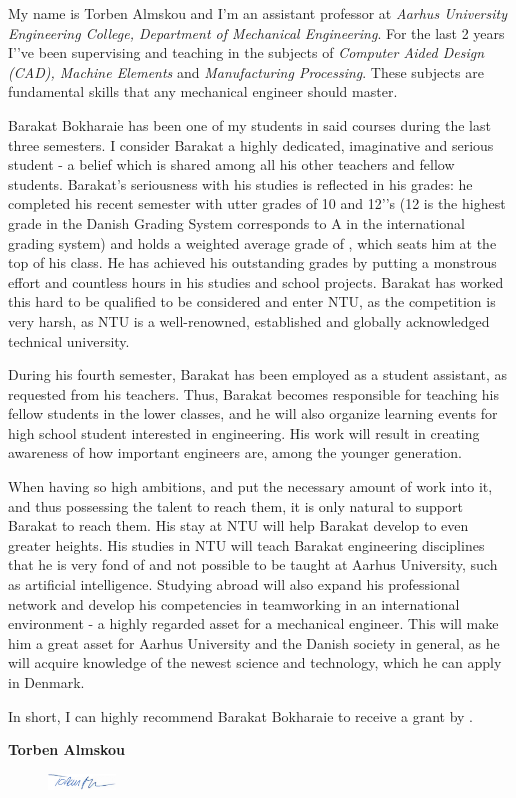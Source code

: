 \documentclass[../Ansoegning.tex]{subfiles}
\begin{document}
My name is Torben Almskou and I'm an assistant professor at \textit{Aarhus University Engineering College, Department of Mechanical Engineering}. For the last 2 years I’'ve been supervising and teaching in the subjects of \textit{Computer Aided Design (CAD), Machine Elements} and \textit{Manufacturing Processing}. These subjects are fundamental skills that any mechanical engineer should master.

Barakat Bokharaie has been one of my students in said courses during the last three semesters. I consider Barakat a highly dedicated, imaginative and serious student - a belief which is shared among all his other teachers and fellow students. Barakat’s seriousness with his studies is reflected in his grades: he completed his recent semester with utter grades of 10 and 12’'s (12 is the highest grade in the Danish Grading System corresponds to A in the international grading system) and holds a weighted average grade of \avgKar, which seats him at the top of his class. He has achieved his outstanding grades by putting a monstrous effort and countless hours in his studies and school projects. Barakat has worked this hard to be qualified to be considered and enter NTU, as the competition is very harsh, as NTU is a well-renowned, established and globally acknowledged technical university.

During his fourth semester, Barakat has been employed as a student assistant, as requested from his teachers. Thus, Barakat becomes responsible for teaching his fellow students in the lower classes, and he will also organize learning events for high school student interested in engineering. His work will result in creating awareness of how important engineers are, among the younger generation.

When having so high ambitions, and put the necessary amount of work into it, and thus possessing the talent to reach them, it is only natural to support Barakat to reach them. His stay at NTU will help Barakat develop to even greater heights. His studies in NTU will teach Barakat engineering disciplines that he is very fond of and not possible to be taught at Aarhus University, such as artificial intelligence. Studying abroad will also expand his professional network and develop his competencies in teamworking in an international environment - a highly regarded asset for a mechanical engineer. This will make him a great asset for Aarhus University and the Danish society in general, as he will acquire knowledge of the newest science and technology, which he can apply in Denmark.

In short, I can highly recommend Barakat Bokharaie to receive a grant by \FondNavn. \vspace{-3mm}

\textbf{Torben Almskou}
\begin{figure}[H]
	\flushleft
	\includegraphics[width=0.16\textwidth]{Billeder/underskrift.JPG}
\end{figure}
\end{document}
